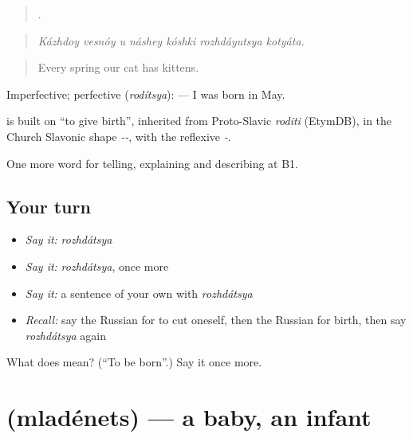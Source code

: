 \begin{quote}
      .
\end{quote}

\begin{quote}
\emph{Kázhdoy vesnóy u náshey kóshki rozhdáyutsya kotyáta.}
\end{quote}

\begin{quote}
Every spring our cat has kittens.
\end{quote}

Imperfective; perfective \emph{} (\emph{rodítsya}): \emph{   } — I was born in May.

\begin{cousinweb}
\emph{} is built on \emph{} \textquotedblleft{}to give birth\textquotedblright{}, inherited from Proto-Slavic \emph{roditi} (EtymDB), in the Church Slavonic shape \emph{--}, with the reflexive \emph{-}.
\end{cousinweb}

\begin{grammarlens}[title={What you've built}]
One more word for telling, explaining and describing at B1.
\end{grammarlens}

\subsection*{Your turn}
\begin{itemize}
\raggedright
  \item \emph{Say it:} \emph{rozhdátsya}
  \item \emph{Say it:} \emph{rozhdátsya}, once more
  \item \emph{Say it:} a sentence of your own with \emph{rozhdátsya}
  \item \emph{Recall:} say the Russian for to cut oneself, then the Russian for birth, then say \emph{rozhdátsya} again
\end{itemize}

\begin{tcolorbox}[breakable,colback=teal!4,colframe=teal!35!black,title={Before you move on}]
What does  mean? (\textquotedblleft{}To be born\textquotedblright{}.) Say it once more.
\end{tcolorbox}
\section[\texorpdfstring{\ru{младенец} (mladénets)}{младенец (mladénets)}]{ (mladénets) — a baby, an infant}

